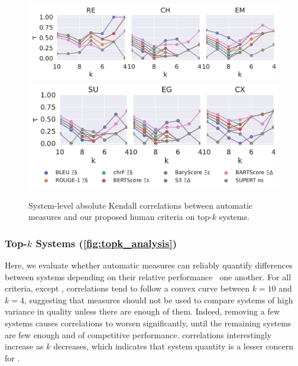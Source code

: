 \begin{figure}[h]
\centering
\includegraphics[width=\columnwidth]{pictures/topk1_system_kendall.pdf}
\includegraphics[width=\columnwidth]{pictures/topk2_system_kendall.pdf}
\caption{System-level absolute Kendall correlations between automatic measures and our proposed human criteria on top-$k$ systems.}
\label{fig:topk_analysis}
\end{figure}

\subsubsection{Top-$k$ Systems (\autoref{fig:topk_analysis})}

Here, we evaluate whether automatic measures can reliably quantify differences between systems depending on their relative performance \wrt\ one another. For all criteria, except {\myre}, correlations tend to follow a convex curve between $k=10$ and $k=4$, suggesting that measures should not be used to compare systems of high variance in quality unless there are enough of them. Indeed, removing a few systems causes correlations to worsen significantly, until the remaining systems are few enough and of competitive performance. {\myre} correlations interestingly increase as $k$ decreases, which indicates that system quantity is a lesser concern for {\myre}.

